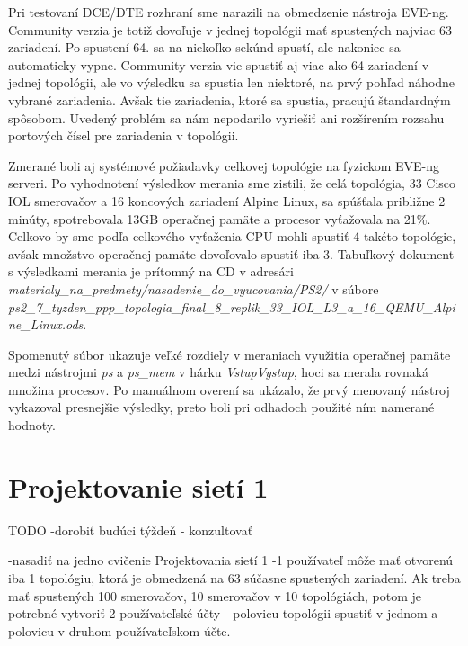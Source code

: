 Pri testovaní DCE/DTE rozhraní sme narazili na obmedzenie nástroja EVE-ng. Community verzia je totiž dovoľuje v jednej topológii mať spustených najviac 63 zariadení. Po spustení 64. sa na niekoľko sekúnd spustí, ale nakoniec sa automaticky vypne. Community verzia vie spustiť aj viac ako 64 zariadení v jednej topológii, ale vo výsledku sa spustia len niektoré, na prvý pohľad náhodne vybrané zariadenia. Avšak tie zariadenia, ktoré sa spustia, pracujú štandardným spôsobom. Uvedený problém sa nám nepodarilo vyriešiť ani rozšírením rozsahu portových čísel pre zariadenia v topológii.
  
Zmerané boli aj systémové požiadavky celkovej topológie na fyzickom EVE-ng serveri. Po vyhodnotení výsledkov merania sme zistili, že celá topológia, 33 Cisco IOL smerovačov a 16 koncových zariadení Alpine Linux, sa spúšťala približne 2 minúty, spotrebovala 13GB operačnej pamäte a procesor vyťažovala na 21\%. Celkovo by sme podľa celkového vyťaženia CPU mohli spustiť 4 takéto topológie, avšak množstvo operačnej pamäte dovoľovalo spustiť iba 3. Tabuľkový dokument s výsledkami merania je prítomný na CD v adresári \\ \emph{materialy\_na\_predmety/nasadenie\_do\_vyucovania/PS2/} v súbore \\ \emph{ps2\_7\_tyzden\_ppp\_topologia\_final\_8\_replik\_33\_IOL\_L3\_a\_16\_QEMU\_Alpine\_Linux.ods}.

Spomenutý súbor ukazuje veľké rozdiely v meraniach využitia operačnej pamäte medzi nástrojmi \emph{ps} a \emph{ps\_mem} v hárku \emph{VstupVystup}, hoci sa merala rovnaká množina procesov. Po manuálnom overení sa ukázalo, že prvý menovaný nástroj vykazoval presnejšie výsledky, preto boli pri odhadoch použité ním namerané hodnoty.





\section{Projektovanie sietí 1}

{\huge TODO -dorobiť budúci týždeň - konzultovať}

-nasadiť na jedno cvičenie Projektovania sietí 1
-1 používateľ môže mať otvorenú iba 1 topológiu, ktorá je obmedzená na 63 súčasne spustených zariadení. Ak treba mať spustených 100 smerovačov, 10 smerovačov v 10 topológiách, potom je potrebné vytvoriť 2 používateľské účty - polovicu topológii spustiť v jednom a polovicu v druhom používateľskom účte.





